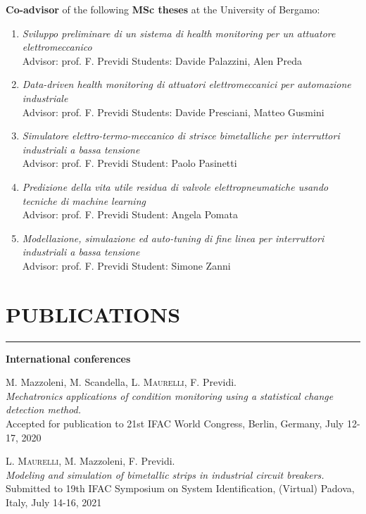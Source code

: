 \documentclass[10pt]{article}
\newcommand{\cvsection}[1]{\section*{\centering\normalsize\uppercase{#1}}\vspace{-16pt}\rule{\linewidth}{0.2pt}\vspace{6pt}}
\begin{document}
\textbf{Co-advisor} of the following \textbf{MSc theses} at the University of Bergamo:
\begin{enumerate}
	\setlength\itemsep{-3pt}
	\item \textit{Sviluppo preliminare di un sistema di health monitoring per un attuatore elettromeccanico}\\
	Advisor: prof. F. Previdi \hfill Students: Davide Palazzini, Alen Preda
	\item \textit{Data-driven health monitoring di attuatori elettromeccanici per automazione industriale}\\
	Advisor: prof. F. Previdi \hfill Students: Davide Presciani, Matteo Gusmini
	\item \textit{Simulatore elettro-termo-meccanico di strisce bimetalliche per interruttori industriali a bassa tensione}\\
	Advisor: prof. F. Previdi \hfill Student: Paolo Pasinetti
	\item \textit{Predizione della vita utile residua di valvole elettropneumatiche usando tecniche di machine learning}\\
	Advisor: prof. F. Previdi \hfill Student: Angela Pomata
	\item \textit{Modellazione, simulazione ed auto-tuning di fine linea per interruttori industriali a bassa tensione}\\
	Advisor: prof. F. Previdi \hfill Student: Simone Zanni
\end{enumerate}


\cvsection{publications}

\textbf{International conferences}
\begin{enumerate}[label={[C0{\arabic*}]}]
	\setlength\itemsep{-3pt}
	\item M. Mazzoleni, M. Scandella, \textsc{L. Maurelli}, F. Previdi.\\
	\textit{Mechatronics applications of condition monitoring using a statistical change detection method.}\\
	Accepted for publication to 21st IFAC World Congress, Berlin, Germany, July 12-17, 2020
	\item \textsc{L. Maurelli}, M. Mazzoleni, F. Previdi.\\
	\textit{Modeling and simulation of bimetallic strips in industrial circuit breakers.}\\
	Submitted to 19th IFAC Symposium on System Identification, (Virtual) Padova, Italy, July 14-16, 2021
\end{enumerate}
\end{document}
